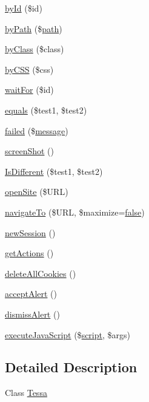 \begin{DoxyCompactItemize}
\hyperlink{classTessa_ae146b22ed7951b61143efd7073d0ea2c}{by\+Id} (\$id)
\item 
\hyperlink{classTessa_a91a3e45138fd2f8325a2a94c4a6ba617}{by\+Path} (\$\hyperlink{Shape_8php_a3b05eec13add53df44e232273d718ae4}{path})
\item 
\hyperlink{classTessa_ac535720770b7bed0ea1120aa121c7ea8}{by\+Class} (\$class)
\item 
\hyperlink{classTessa_af0f1f7c19711f0527bd1372a096038bd}{by\+C\+S\+S} (\$css)
\item 
\hyperlink{classTessa_a71e812fa28e3bdb00c6b2b2ee99cbead}{wait\+For} (\$id)
\item 
\hyperlink{classTessa_a6cc78554f7d5d4a07582b20aed6fcc82}{equals} (\$test1, \$test2)
\item 
\hyperlink{classTessa_a3454246c38eb3976f01d1e9db22cdc4f}{failed} (\$\hyperlink{classTessa_a7e4c039b8228d75810747b96b5062366}{message})
\item 
\hyperlink{classTessa_a410bf71687fffc9d1c5bd674df222eba}{screen\+Shot} ()
\item 
\hyperlink{classTessa_accf6a6c6874c25022b628bc81918a9d0}{Is\+Different} (\$test1, \$test2)
\item 
\hyperlink{classTessa_a98467e5342f835681757cc6d5dfd65ea}{open\+Site} (\$U\+R\+L)
\item 
\hyperlink{classTessa_a25eea31800caf29f6cac70c7ef4969c6}{navigate\+To} (\$U\+R\+L, \$maximize=\hyperlink{tina4_8php_aec2deb5590a84bee262c3bea206ae88f}{false})
\item 
\hyperlink{classTessa_ac3a16f8c732b364c4feca92c2f71cc7e}{new\+Session} ()
\item 
\hyperlink{classTessa_a3fce6a71a2303c0bccd0d447375d1c96}{get\+Actions} ()
\item 
\hyperlink{classTessa_ae158939762eb598225ed156a23f95fc2}{delete\+All\+Cookies} ()
\item 
\hyperlink{classTessa_ac6310dd007ead434f3d8cd2698263ded}{accept\+Alert} ()
\item 
\hyperlink{classTessa_a4fbf1f0db39dcb95c2f8c51d73f0b02f}{dismiss\+Alert} ()
\item 
\hyperlink{classTessa_a14a21a710a7eece5d01eb93a010c896e}{execute\+Java\+Script} (\$\hyperlink{Shape_8php_ac2a3056c7a62af99ebe52fdaa4e2e4da}{script}, \$args)
\end{DoxyCompactItemize}


\subsection{Detailed Description}
Class \hyperlink{classTessa}{Tessa} 

